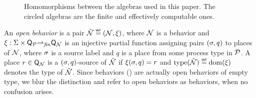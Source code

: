 \begin{figure}[t!]
  \vspace*{-\baselineskip}
  \begin{center}
    \vspace*{-\baselineskip}
    \caption{Homomorphisms between the \hrtext{} algebras used in this
      paper. The circled algebras are the finite and effectively
      computable ones.}
    \label{fig:alg-zoo}
  \end{center}
  \vspace*{-2\baselineskip}
\end{figure}

An \emph{open behavior} is a pair
$\check{\mathcal{N}}\stackrel{\scriptscriptstyle{\mathsf{def}}}{=}(\mathcal{N},\xi)$, where $\mathcal{N}$
is a behavior and $\xi : \Sigma \times \mathsf{Q}_{\mathcal{P}}
{\rightharpoonup_{\mathit{fin}}} \mathsf{Q}_{\mathcal{N}}$ is an injective partial function
assigning pairs $(\sigma,q)$ to places of $\mathcal{N}$, where $\sigma$
is a source label and $q$ is a place from some process type in
$\mathcal{P}$. A place $r\in\mathsf{Q}_{\mathcal{N}}$ is a $(\sigma,q)$-source
of $\check{\mathcal{N}}$ if $\xi(\sigma,q)=r$ and
$\mathrm{type}({\check{\mathcal{N}}}) \stackrel{\scriptscriptstyle{\mathsf{def}}}{=} {\mathrm{dom}({\xi})}$ denotes the type
of $\check{\mathcal{N}}$. Since behaviors () are
actually open behaviors of empty type, we blur the distinction and
refer to open behaviors as behaviors, when no confusion arises.

